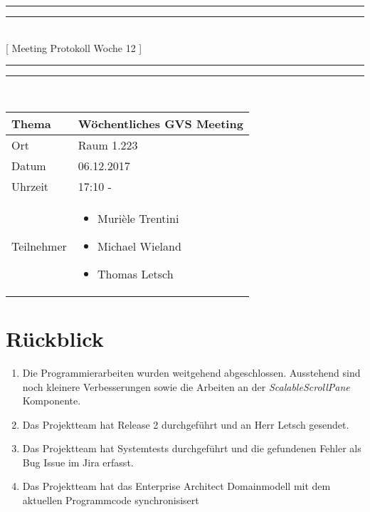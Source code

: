\documentclass[11pt, a4paper,oneside]{scrartcl}
\begin{document}
	\centering
	\rule{\textwidth}{1.6pt}\vspace*{-\baselineskip}\vspace*{2pt} %
	\rule{\textwidth}{0.4pt}\\[\baselineskip] %
	{\LARGE [ Meeting Protokoll Woche 12 ]}\\[0.2\baselineskip] %
	\rule{\textwidth}{0.4pt}\vspace*{-\baselineskip}\vspace{3.2pt} %
	\rule{\textwidth}{1.6pt}\\[2\baselineskip] %
	
	\begin{tabu} to \linewidth {l X }
		\toprule
		\textbf{Thema} & \textbf{Wöchentliches GVS Meeting} \\
		\midrule
		Ort & Raum 1.223 \\
		Datum & 06.12.2017  \\
		Uhrzeit &  17:10 -  \\
		Teilnehmer & 
		\begin{minipage}[t]{\textwidth}
			\begin{itemize}
				\item Murièle Trentini
				\item Michael Wieland
				\item Thomas Letsch
			\end{itemize}
		\end{minipage}
		\\
		\bottomrule
	\end{tabu}
	
	
	\section{Rückblick}
	\begin{enumerate}
		\item Die Programmierarbeiten wurden weitgehend abgeschlossen. Ausstehend sind noch kleinere Verbesserungen sowie die Arbeiten an der \textit{ScalableScrollPane} Komponente.
		\item Das Projektteam hat Release 2 durchgeführt und an Herr Letsch gesendet.
		\item Das Projektteam hat Systemtests durchgeführt und die gefundenen Fehler als Bug Issue im Jira erfasst.
		\item Das Projektteam hat das Enterprise Architect Domainmodell mit dem aktuellen Programmcode synchronisisert
	\end{enumerate}
	
\end{document}

